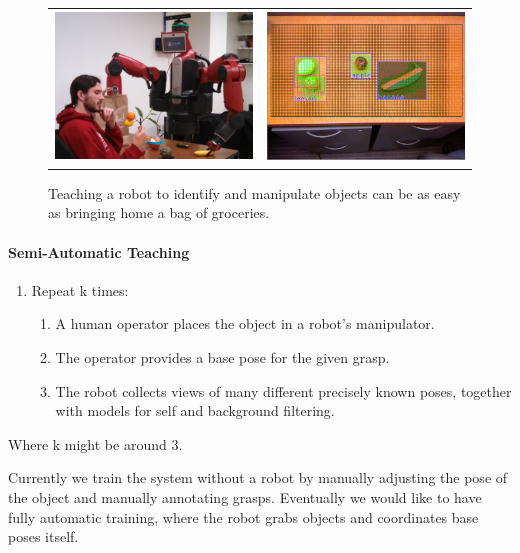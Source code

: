 \documentclass[12pt]{article}
\numberwithin{equation}{section}
\numberwithin{table}{section}
\numberwithin{figure}{section}
\begin{document}
\begin{figure}
  \begin{center}
    \begin{tabular}{l c}
      \includegraphics[width=200px, height=150px]{robo2.png} &
      \includegraphics[width=200px, height=150px]{screen2.png} \\
    \end{tabular}
  \end{center}
  \caption{Teaching a robot to identify and manipulate objects can be as easy as bringing home
	    a bag of groceries.}
\end{figure}

\paragraph{Semi-Automatic Teaching}

\begin{enumerate}
  \item Repeat k times:
  \begin{enumerate}
    \item A human operator places the object in a robot's manipulator.
    \item The operator provides a base pose for the given grasp.
    \item The robot collects views of many different precisely known poses, together with models for self and background filtering.
  \end{enumerate}
\end{enumerate}

Where k might be around 3. 

Currently we train the system without a robot by manually adjusting the pose of the object and manually
annotating grasps. Eventually we would like to have fully automatic training, where the
robot grabs objects and coordinates base poses itself.
\end{document}
